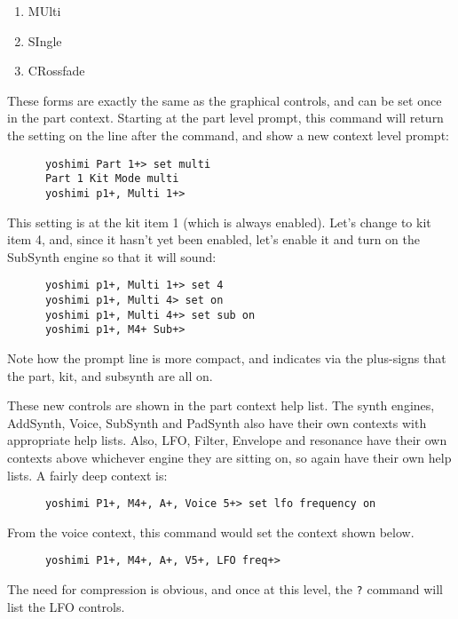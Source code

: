    \begin{enumerate}
      \item MUlti
      \item SIngle
      \item CRossfade
   \end{enumerate}

   These forms are exactly the same as the graphical controls,
   and can be set once in the part context.
   Starting at the part level prompt, this command will return the setting
   on the line after the command, and show a new context level prompt:

   \begin{verbatim}
      yoshimi Part 1+> set multi
      Part 1 Kit Mode multi
      yoshimi p1+, Multi 1+>
   \end{verbatim}

   This setting is at the kit item 1 (which is always enabled).
   Let's change to kit item 4, and, since it hasn't yet been enabled,
   let's enable it and turn on the
   SubSynth engine so that it will sound:

   \begin{verbatim}
      yoshimi p1+, Multi 1+> set 4
      yoshimi p1+, Multi 4> set on
      yoshimi p1+, Multi 4+> set sub on
      yoshimi p1+, M4+ Sub+>
   \end{verbatim}

   Note how the prompt line is more compact, and indicates via the
   plus-signs that the part, kit, and subsynth are all on.

   These new controls are shown in the part context help list.
   The synth engines, AddSynth, Voice, SubSynth and PadSynth also have
   their own contexts with appropriate help lists.
   Also, LFO, Filter, Envelope and resonance have their own contexts
   above whichever engine they are sitting on, so again have their own
   help lists.
   A fairly deep context is:

   \begin{verbatim}
      yoshimi P1+, M4+, A+, Voice 5+> set lfo frequency on
   \end{verbatim}

   From the voice context, this command would set the context shown below.

   \begin{verbatim}
      yoshimi P1+, M4+, A+, V5+, LFO freq+>
   \end{verbatim}

   The need for compression is obvious, and once at this level, the \texttt{?} command will list the LFO controls.

